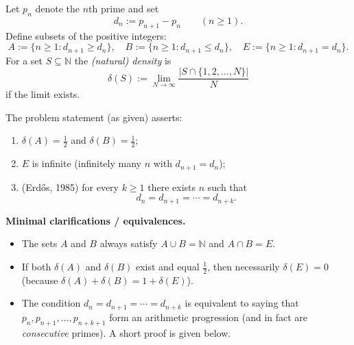 Let $p_n$ denote the $n$th prime and set
\[
 d_n := p_{n+1}-p_n \qquad (n\ge 1).
\]
Define subsets of the positive integers:
\[
A:=\{n\ge 1: d_{n+1}\ge d_n\},\quad
B:=\{n\ge 1: d_{n+1}\le d_n\},\quad
E:=\{n\ge 1: d_{n+1}=d_n\}.
\]
For a set $S\subseteq\mathbb N$ the \emph{(natural) density} is
\[
\delta(S):=\lim_{N\to\infty}\frac{|S\cap\{1,2,\dots,N\}|}{N}
\]
if the limit exists.

The problem statement (as given) asserts:
\begin{enumerate}[label=(\alph*)]
\item $\delta(A)=\tfrac12$ and $\delta(B)=\tfrac12$;
\item $E$ is infinite (infinitely many $n$ with $d_{n+1}=d_n$);
\item (Erd\H{o}s, 1985) for every $k\ge 1$ there exists $n$ such that
\[d_n=d_{n+1}=\cdots=d_{n+k}.
\]
\end{enumerate}

\medskip
\noindent\textbf{Minimal clarifications / equivalences.}
\begin{itemize}
\item The sets $A$ and $B$ always satisfy $A\cup B=\mathbb N$ and $A\cap B=E$.
\item If both $\delta(A)$ and $\delta(B)$ exist and equal $\tfrac12$, then necessarily $\delta(E)=0$ (because $\delta(A)+\delta(B)=1+\delta(E)$).
\item The condition $d_n=d_{n+1}=\cdots=d_{n+k}$ is equivalent to saying that
$p_n,p_{n+1},\dots,p_{n+k+1}$ form an arithmetic progression (and in fact are \emph{consecutive} primes).
A short proof is given below.
\end{itemize}
